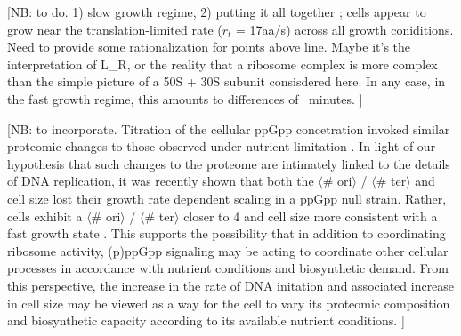 [NB: to do. 1) slow growth regime, 2) putting it all together ; cells appear to
grow near the translation-limited rate ($r_t$ = 17aa/s) across all growth coniditions. Need
to provide some rationalization for points above line. Maybe it's the interpretation
of L_R, or the reality that a ribosome complex is more complex than the simple picture of a 50S + 30S subunit consisdered here. In any case, in the fast growth regime, this amounts to
differences of ~minutes. ]

[NB: to incorporate. Titration of the cellular ppGpp concetration invoked similar proteomic changes
to those observed under nutrient limitation \citep{zhu2019}. In light of our
hypothesis that such changes to the proteome are intimately linked to  the
details of DNA replication, it was recently shown that both the  $\langle$\#
ori$\rangle$ / $\langle$\# ter$\rangle$ and cell size lost their growth rate
dependent scaling in a ppGpp null strain. Rather, cells exhibit a $\langle$\#
ori$\rangle$ / $\langle$\# ter$\rangle$ closer to 4 and cell size more
consistent with a fast growth state \citep{fernandezcoll2020}. This supports the
possibility that in addition  to coordinating ribosome activity, (p)ppGpp
signaling may be acting to coordinate other  cellular processes in accordance
with nutrient conditions and biosynthetic demand. From this  perspective, the
increase in the rate of DNA initation and associated increase in cell  size may
be viewed as a way for the cell to vary its proteomic composition and
biosynthetic  capacity according to its available nutrient conditions. ]



